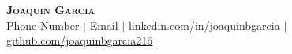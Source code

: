 \begin{center}
    \textbf{\Huge \scshape Joaquin Garcia} \\ \vspace{1pt}
    \small{Phone Number $|$ Email $|$ }\href{https://linkedin.com/in/joaquinbgarcia}{linkedin.com/in/joaquinbgarcia} $|$
  \href{https://github.com/joaquinbgarcia216}{github.com/joaquinbgarcia216}
\end{center}